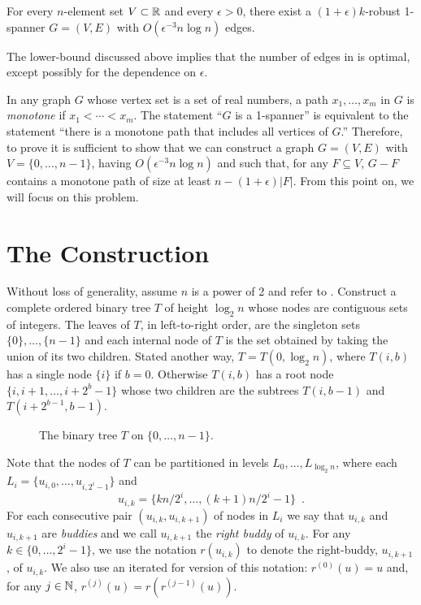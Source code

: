 \documentclass{patmorin}
\begin{document}
\begin{thm}
  For every $n$-element set $V\subset\mathbb{R}$ and every $\epsilon>0$,
  there exist a $(1+\epsilon)k$-robust 1-spanner $G=(V,E)$ with
  $O(\epsilon^{-3}n\log n)$ edges.
\end{thm}

The lower-bound discussed above implies that the number of edges
in  is optimal, except possibly for the dependence on
$\epsilon$.

In any graph $G$ whose vertex set is a set of real numbers, a path
$x_1,\ldots,x_m$ in $G$ is \emph{monotone} if $x_1<\cdots<x_m$.
The statement ``$G$ is a 1-spanner'' is equivalent to the statement
``there is a monotone path that includes all vertices of $G$.'' Therefore,
to prove  it is sufficient to show that we can construct a
graph $G=(V,E)$ with $V=\{0,\ldots,n-1\}$, having $O(\epsilon^{-3} n\log n)$
and such that, for any $F\subseteq V$, $G-F$ contains a monotone path
of size at least $n-(1+\epsilon)|F|$.  From this point on, we will focus
on this problem.

\section{The Construction}

Without loss of generality, assume $n$ is a power of 2 and refer to
.  Construct a complete ordered binary tree $T$ of height
$\log_2 n$ whose nodes are contiguous sets of integers.  The leaves of
$T$, in left-to-right order, are the singleton sets $\{0\},\ldots,\{n-1\}$
and each internal node of $T$ is the set obtained by taking the union
of its two children.  Stated another way, $T=T(0,\log_2 n)$, where
$T(i,b)$ has a single node $\{i\}$ if $b=0$. Otherwise $T(i,b)$ has
a root node $\{i,i+1,\ldots,i+2^{b}-1\}$ whose two children are the
subtrees $T(i,b-1)$ and $T(i+2^{b-1}, b-1)$.

\begin{figure}
  \caption{The binary tree $T$ on $\{0,\ldots,n-1\}$.}
\end{figure}

Note that the nodes of $T$ can be partitioned in levels $L_0,\ldots,L_{\log_2 n}$, where each $L_i=\{u_{i,0},\ldots,u_{i,2^i-1}\}$ and
\[
  u_{i,k} = \{kn/2^i,\ldots,(k+1)n/2^{i}-1\} \enspace .
\]
For each consecutive pair $(u_{i,k},u_{i,k+1})$ of nodes in $L_i$ we say
that $u_{i,k}$ and $u_{i,k+1}$ are \emph{buddies} and we call $u_{i,k+1}$
the \emph{right buddy} of $u_{i,k}$.  For any $k\in\{0,\ldots,2^{i}-1\}$,
we use the notation $r(u_{i,k})$ to denote the right-buddy, $u_{i,k+1}$,
of $u_{i,k}$.  We also use an iterated for version of this notation:
$r^{(0)}(u)=u$ and, for any $j\in\mathbb{N}$, $r^{(j)}(u)=r(r^{{(j-1)}}(u))$.
\end{document}
